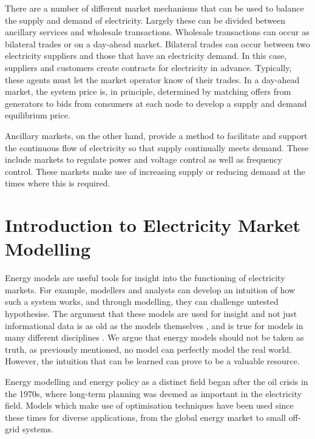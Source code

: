 There are a number of different market mechanisms that can be used to balance the supply and demand of electricity. Largely these can be divided between ancillary services and wholesale transactions. Wholesale transactions can occur as bilateral trades or on a day-ahead market. Bilateral trades can occur between two electricity suppliers and those that have an electricity demand. In this case, suppliers and customers create contracts for electricity in advance. Typically, these agents must let the market operator know of their trades. In a day-ahead market, the system price is, in principle, determined by matching offers from generators to bids from consumers at each node to develop a supply and demand equilibrium price. 

Ancillary markets, on the other hand, provide a method to facilitate and support the continuous flow of electricity so that supply continually meets demand. These include markets to regulate power and voltage control as well as frequency control. These markets make use of increasing supply or reducing demand at the times where this is required. 







\section{Introduction to Electricity Market Modelling}
\label{sec:intro:elecmarketsmodelling}


Energy models are useful tools for insight into the functioning of electricity markets. For example, modellers and analysts can develop an intuition of how such a system works, and through modelling, they can challenge untested hypothesise. The argument that these models are used for insight and not just informational data is as old as the models themselves \cite{Huntington1982, Pfenninger2014b}, and is true for models in many different disciplines \cite{Geoffrion1976}. We argue that energy models should not be taken as truth, as previously mentioned, no model can perfectly model the real world. However, the intuition that can be learned can prove to be a valuable resource.

Energy modelling and energy policy as a distinct field began after the oil crisis in the 1970s, where long-term planning was deemed as important in the electricity field. Models which make use of optimisation techniques have been used since these times for diverse applications, from the global energy market to small off-grid systems.

